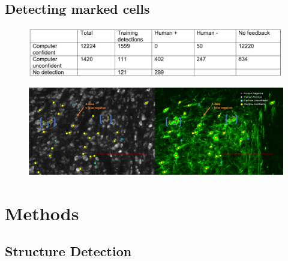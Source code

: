 \documentclass[11pt]{article}
\begin{document}
\subsection{Detecting marked cells}

\begin{figure}[t]
  \includegraphics[width=\textwidth]{figures/MarkedCellsDetectionNumbers.png}
\end{figure}

\begin{figure}[b]
  \includegraphics[width=\textwidth]{figures/Marked_cell_detections.png}
  \caption{}
\end{figure}

\newpage

\section{Methods}

\subsection{Structure Detection}
\end{document}
